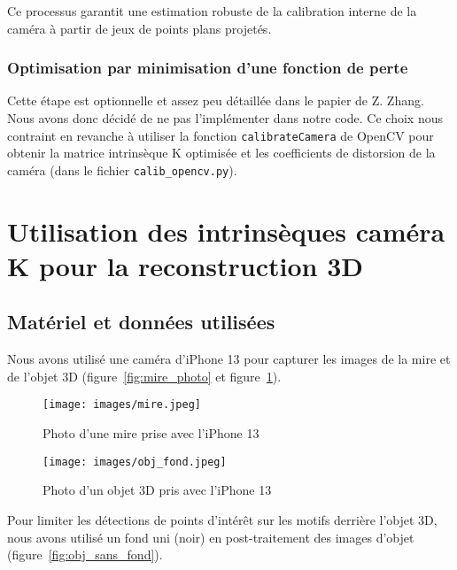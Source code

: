 \documentclass[12pt]{article}
\begin{document}
Ce processus garantit une estimation robuste de la calibration interne de la caméra à partir de jeux de points plans projetés.

\subsubsection{Optimisation par minimisation d'une fonction de perte}

Cette étape est optionnelle et assez peu détaillée dans le papier de Z. Zhang. Nous avons donc décidé de ne pas l'implémenter dans notre code.
Ce choix nous contraint en revanche à utiliser la fonction \texttt{calibrateCamera} de OpenCV pour obtenir la matrice intrinsèque K optimisée et les coefficients de distorsion de la caméra (dans le fichier \texttt{calib\_opencv.py}).

\newpage
\section{Utilisation des intrinsèques caméra K pour la reconstruction 3D}

\subsection{Matériel et données utilisées}

Nous avons utilisé une caméra d'iPhone 13 pour capturer les images de la mire et de l'objet 3D (figure~\ref{fig:mire_photo} et figure~\ref{fig:obj_fond}).

\begin{figure}[H]
    \centering
    \begin{minipage}[b]{0.45\textwidth}
        \centering
        \texttt{[image: images/mire.jpeg]}
        \caption{Photo d'une mire prise avec l'iPhone 13}
        \label{fig:mire_photo}
    \end{minipage}\hfill
    \begin{minipage}[b]{0.45\textwidth}
        \centering
        \texttt{[image: images/obj\_fond.jpeg]}
        \caption{Photo d'un objet 3D pris avec l'iPhone 13}
        \label{fig:obj_fond}
    \end{minipage}
\end{figure}

Pour limiter les détections de points d'intérêt sur les motifs derrière l'objet 3D, nous avons utilisé un fond uni (noir) en post-traitement des images d'objet (figure~\ref{fig:obj_sans_fond}).
\end{document}
